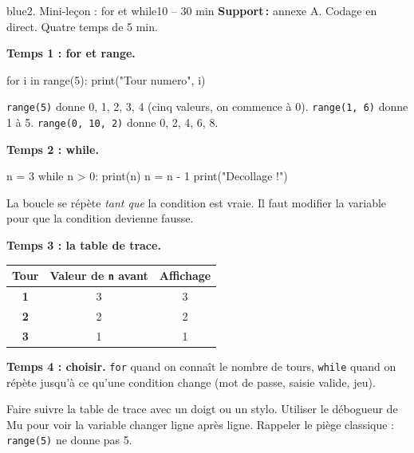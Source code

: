 \documentclass[11pt,a4paper]{article}
\begin{document}
\begin{etape}{blue}{2. Mini-leçon : for et while}{10 -- 30 min}
\textbf{Support\,:} annexe A. Codage en direct. Quatre temps de 5 min.

\textbf{Temps 1 : for et range.}
\begin{python}
for i in range(5):
    print("Tour numero", i)
\end{python}
\texttt{range(5)} donne 0, 1, 2, 3, 4 (cinq valeurs, on commence à 0). \texttt{range(1, 6)} donne 1 à 5. \texttt{range(0, 10, 2)} donne 0, 2, 4, 6, 8.

\textbf{Temps 2 : while.}
\begin{python}
n = 3
while n > 0:
    print(n)
    n = n - 1
print("Decollage !")
\end{python}
La boucle se répète \emph{tant que} la condition est vraie. Il faut modifier la variable pour que la condition devienne fausse.

\textbf{Temps 3 : la table de trace.}
\begin{center}
\begin{tabularx}{0.8\linewidth}{>{\bfseries}c c c}
\toprule
Tour & Valeur de \texttt{n} avant & Affichage\\
\midrule
1 & 3 & 3\\
2 & 2 & 2\\
3 & 1 & 1\\
\bottomrule
\end{tabularx}
\end{center}

\textbf{Temps 4 : choisir.} \texttt{for} quand on connaît le nombre de tours, \texttt{while} quand on répète jusqu'à ce qu'une condition change (mot de passe, saisie valide, jeu).

\begin{astuce}
Faire suivre la table de trace avec un doigt ou un stylo. Utiliser le débogueur de Mu pour voir la variable changer ligne après ligne. Rappeler le piège classique : \texttt{range(5)} ne donne pas 5.
\end{astuce}
\end{etape}
\end{document}
